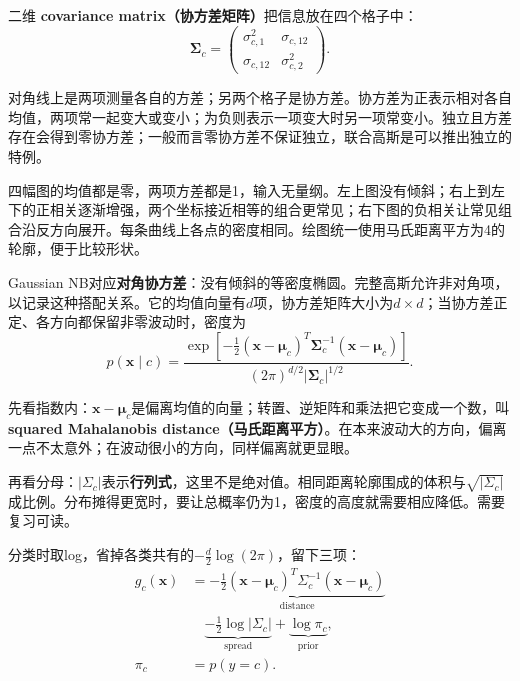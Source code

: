 二维 \textbf{covariance matrix（协方差矩阵）}把信息放在四个格子中：
\[
\boldsymbol\Sigma_c=
\begin{pmatrix}
\sigma_{c,1}^2 & \sigma_{c,12}\\
\sigma_{c,12} & \sigma_{c,2}^2
\end{pmatrix}.
\tag{2.17}
\]


对角线上是两项测量各自的方差；另两个格子是协方差。协方差为正表示相对各自均值，两项常一起变大或变小；为负则表示一项变大时另一项常变小。独立且方差存在会得到零协方差；一般而言零协方差不保证独立，联合高斯是可以推出独立的特例。




四幅图的均值都是零，两项方差都是1，输入无量纲。左上图没有倾斜；右上到左下的正相关逐渐增强，两个坐标接近相等的组合更常见；右下图的负相关让常见组合沿反方向展开。每条曲线上各点的密度相同。绘图统一使用马氏距离平方为4的轮廓，便于比较形状。


Gaussian NB对应\textbf{对角协方差}：没有倾斜的等密度椭圆。完整高斯允许非对角项，以记录这种搭配关系。它的均值向量有\(d\)项，协方差矩阵大小为\(d\times d\)；当协方差正定、各方向都保留非零波动时，密度为
\[
p(\mathbf x\mid c)=
\frac{\exp[-\frac12(\mathbf x-\boldsymbol\mu_c)^T
\boldsymbol\Sigma_c^{-1}(\mathbf x-\boldsymbol\mu_c)]}
{(2\pi)^{d/2}|\boldsymbol\Sigma_c|^{1/2}}.
\tag{2.18}
\]


先看指数内：\(\mathbf x-\boldsymbol\mu_c\)是偏离均值的向量；转置、逆矩阵和乘法把它变成一个数，叫 \textbf{squared Mahalanobis distance（马氏距离平方）}。在本来波动大的方向，偏离一点不太意外；在波动很小的方向，同样偏离就更显眼。


再看分母：\(|\Sigma_c|\)表示\textbf{行列式}，这里不是绝对值。相同距离轮廓围成的体积与\(\sqrt{|\Sigma_c|}\)成比例。分布摊得更宽时，要让总概率仍为1，密度的高度就需要相应降低。需要复习可读。


分类时取log，省掉各类共有的\(-\tfrac d2\log(2\pi)\)，留下三项：
\[
\begin{aligned}
g_c(\mathbf x)&=\underbrace{-\tfrac12(\mathbf x-\boldsymbol\mu_c)^T\Sigma_c^{-1}(\mathbf x-\boldsymbol\mu_c)}_{\text{distance}}\\
&\quad\underbrace{-\tfrac12\log|\Sigma_c|}_{\text{spread}}+\underbrace{\log\pi_c}_{\text{prior}},\\
\pi_c&=p(y=c).
\end{aligned}
\tag{2.19}
\]



